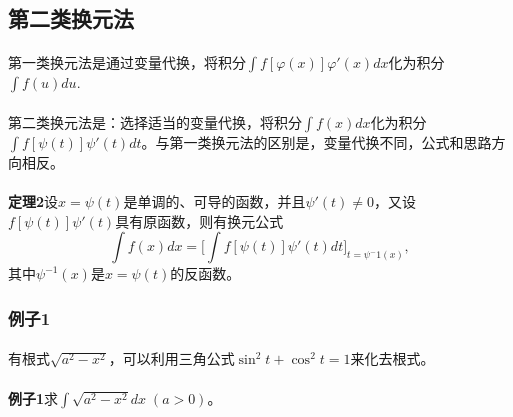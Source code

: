 \subsection{第二类换元法}
\paragraph{}
第一类换元法是通过变量代换，将积分$\displaystyle\int{f[\varphi(x)]\varphi'(x)dx}$化为积分$\displaystyle\int{f(u)du}$.

\paragraph{}
第二类换元法是：选择适当的变量代换，将积分$\displaystyle\int{f(x)dx}$化为积分 \\ $\displaystyle\int{f[\psi(t)]\psi'(t)dt}$。与第一类换元法的区别是，变量代换不同，公式和思路方向相反。

\paragraph{}
\textbf{定理2\;}设$x=\psi(t)$是单调的、可导的函数，并且$\psi'(t)\neq 0$，又设$f[\psi(t)]\psi'(t)$具有原函数，则有换元公式
\begin{equation}
  \int f(x)dx = \big[\int f[\psi(t)]\psi'(t)dt\big]_{t=\psi^-1(x)},
\end{equation}
其中$\psi^{-1}(x)$是$x=\psi(t)$的反函数。

\subsubsection{例子1}
\paragraph{}
有根式$\sqrt{a^2 - x^2}$，可以利用三角公式$\sin^2t+\cos^2t=1$来化去根式。

\paragraph{}
\textbf{例子1\;}求$\displaystyle \int\sqrt{a^2 - x^2}dx \; (a > 0)$。

